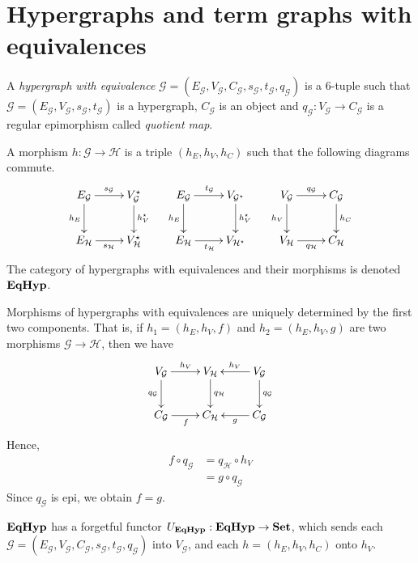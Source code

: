 \section{Hypergraphs and term graphs with equivalences}


\begin{definition}
	A \emph{hypergraph with equivalence} $\mathcal{G} = (E_\mathcal{G}, V_{\mathcal{G}}, C_\mathcal{G}, s_\mathcal{G}, t_\mathcal{G}, q_\mathcal{G})$ is a 6-tuple such that $\mathcal{G} = (E_\mathcal{G}, V_{\mathcal{G}}, s_\mathcal{G}, t_\mathcal{G})$ is a hypergraph, $C_\mathcal{G}$ is an object and $q_{\mathcal{G}}: V_{\mathcal{G}}\to C_{\mathcal{G}}$ is a regular epimorphism called \emph{quotient map}. 
	
	A morphism $h:\mathcal{G\to H}$ is a triple $(h_E, h_V, h_C)$ such that the following diagrams commute.
	\[\xymatrix{
		{E_\mathcal{G}}\ar[r]^{s_\mathcal{G}}\ar[d]_{h_E} & {V_{\mathcal{G}}^\star}\ar[d]^{h_V^\star} & {E_\mathcal{G}}\ar[r]^{t_\mathcal{G}}\ar[d]_{h_E} & {V_{\mathcal{G}^\star}}\ar[d]^{h_V^\star} & {V_\mathcal{G}}\ar[r]^{q_\mathcal{G}}\ar[d]_{h_V} & {C_{\mathcal{G}}} \ar[d]^{h_C} \\
		{E_\mathcal{H}}\ar[r]_{s_\mathcal{H}} & {V_{\mathcal{H}}^\star}	& {E_\mathcal{H}}\ar[r]_{t_\mathcal{H}} & {V_{\mathcal{H}^\star}}& {V_\mathcal{H}}\ar[r]_{q_\mathcal{H}} & {C_\mathcal{H}}
	}\]
	The category of hypergraphs with equivalences and their morphisms is denoted $\textbf{\textup{EqHyp}}$.

\end{definition}

\begin{remark}\label{rem:eqhyp_morphs}
	Morphisms of hypergraphs with equivalences are uniquely determined by the first two components. That is, if $h_1 = (h_E, h_V, f)$ and $h_2 = (h_E, h_V, g)$ are two morphisms $\mathcal{G \to H}$, then we have
	\[\xymatrix{
			{V_\mathcal{G}} \ar[r]^{h_V}\ar[d]_{q_\mathcal{G}} & V_\mathcal{H} \ar[d]^{q_\mathcal{H}} & V_\mathcal{G}\ar[l]_{h_V}\ar[d]^{q_\mathcal{G}}\\
			C_{\mathcal{G}}\ar[r]_{f} & C_{\mathcal{H}} & C_{\mathcal{G}}\ar[l]^{g}
	}\]
	Hence,
	\begin{align*}
		f \circ q_\mathcal{G} &= q_\mathcal{H}\circ h_V \\ &=g\circ q_\mathcal{G}
	\end{align*}
	Since $q_\mathcal{G}$ is epi, we obtain $f = g$.
\end{remark}

$\textbf{\textup{EqHyp}}$ has a forgetful functor $U_{\textbf{\textup{EqHyp}}}:\textbf{\textup{EqHyp}} \to \mathbf{Set}$, which sends each $\mathcal{G} = (E_\mathcal{G}, V_{\mathcal{G}}, C_\mathcal{G}, s_\mathcal{G}, t_\mathcal{G}, q_\mathcal{G})$ into $V_\mathcal{G}$, and each $h = (h_E, h_V, h_C)$ onto $h_V$. 

